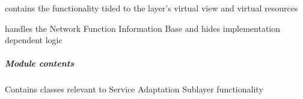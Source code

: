 \documentclass[letterpaper,10pt,english]{sphinxmanual}
\begin{document}
{\hyperref[service/sas_orchestration:escape.service.sas_orchestration.VirtualResourceManager]{\emph{}}} contains the functionality tided to the
layer's virtual view and virtual resources

{\hyperref[orchest/ros_orchestration:escape.orchest.ros_orchestration.NFIBManager]{\emph{}}} handles the Network Function Information Base and hides
implementation dependent logic


\subparagraph{Module contents}
\label{service/sas_orchestration:module-contents}\label{service/sas_orchestration:module-escape.service.sas_orchestration}
Contains classes relevant to Service Adaptation Sublayer functionality
\end{document}
